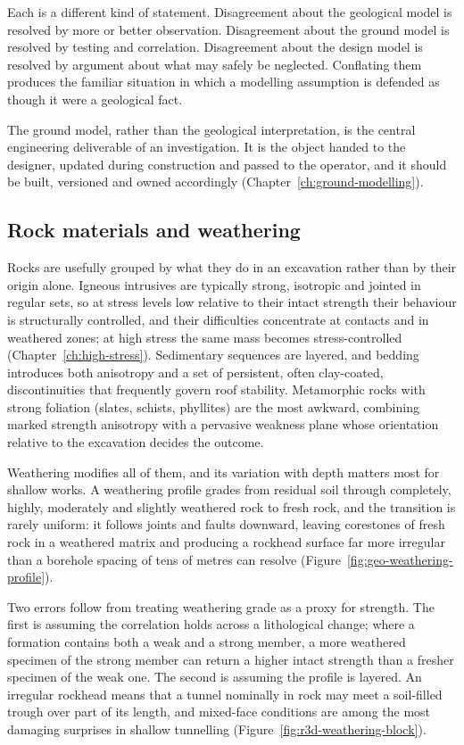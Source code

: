 Each is a different kind of statement.
Disagreement about the geological model is resolved by more or better
observation. Disagreement about the ground model is resolved by testing and
correlation. Disagreement about the design model is resolved by argument about
what may safely be neglected. Conflating them produces the familiar situation
in which a modelling assumption is defended as though it were a geological
fact.

The ground model, rather than the geological interpretation, is the central
engineering deliverable of an investigation. It is the object handed to the
designer, updated during construction and passed to the operator, and it
should be built, versioned and owned accordingly
(Chapter~\ref{ch:ground-modelling}).

\subsection{Rock materials and weathering}
\label{sec:rock-materials}

Rocks are usefully grouped by what they do in an excavation rather than by
their origin alone. Igneous intrusives are typically strong, isotropic and
jointed in regular sets, so at stress levels low relative to their intact
strength their behaviour is structurally controlled, and their difficulties
concentrate at contacts and in weathered zones; at high stress the same mass
becomes stress-controlled (Chapter~\ref{ch:high-stress}).
Sedimentary sequences are layered, and bedding introduces both anisotropy and
a set of persistent, often clay-coated, discontinuities that frequently govern
roof stability. Metamorphic rocks with strong foliation (slates, schists,
phyllites) are the most awkward, combining marked strength anisotropy with
a pervasive weakness plane whose orientation relative to the excavation
decides the outcome.

Weathering modifies all of them, and its variation with depth matters most
for shallow works. A weathering profile grades from residual soil
through completely, highly, moderately and slightly weathered rock to fresh
rock, and
the transition is rarely uniform: it follows joints and faults downward,
leaving corestones of fresh rock in a weathered matrix and producing a
rockhead surface far more irregular than a borehole spacing of tens of metres
can resolve (Figure~\ref{fig:geo-weathering-profile}).

Two errors follow from treating weathering grade as a proxy for strength. The
first is assuming the correlation holds across a lithological change; where a
formation contains both a weak and a strong member, a more weathered specimen
of the strong member can return a higher intact strength than a fresher
specimen of the weak one. The
second is assuming the profile is layered. An irregular rockhead means that a
tunnel nominally in rock may meet a soil-filled trough over part of its
length, and mixed-face conditions are among the most damaging surprises in
shallow tunnelling (Figure~\ref{fig:r3d-weathering-block}).

